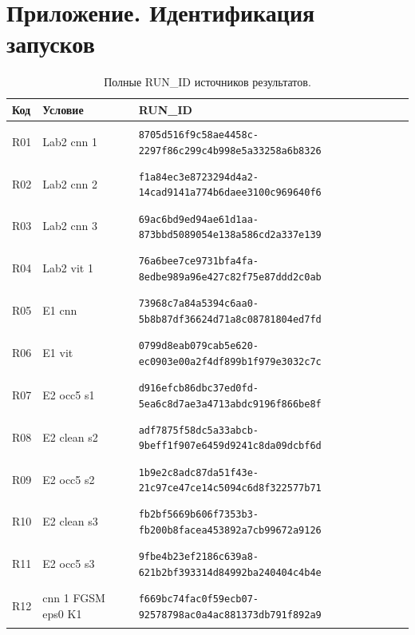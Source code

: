 \section*{Приложение. Идентификация запусков}
\begingroup\small{}
\begin{longtable}{@{}l>{\raggedright\arraybackslash}p{3.5cm}p{10.8cm}@{}}
\caption{Полные RUN\_ID источников результатов.}\\
\toprule Код & Условие & RUN\_ID \\ \midrule \endhead
\hypertarget{R01}{R01} & Lab2 cnn 1 & {\fontsize{8.8}{11}\selectfont\texttt{8705d516f9c58ae4458c-2297f86c299c4b998e5a33258a6b8326}} \\
\hypertarget{R02}{R02} & Lab2 cnn 2 & {\fontsize{8.8}{11}\selectfont\texttt{f1a84ec3e8723294d4a2-14cad9141a774b6daee3100c969640f6}} \\
\hypertarget{R03}{R03} & Lab2 cnn 3 & {\fontsize{8.8}{11}\selectfont\texttt{69ac6bd9ed94ae61d1aa-873bbd5089054e138a586cd2a337e139}} \\
\hypertarget{R04}{R04} & Lab2 vit 1 & {\fontsize{8.8}{11}\selectfont\texttt{76a6bee7ce9731bfa4fa-8edbe989a96e427c82f75e87ddd2c0ab}} \\
\hypertarget{R05}{R05} & E1 cnn & {\fontsize{8.8}{11}\selectfont\texttt{73968c7a84a5394c6aa0-5b8b87df36624d71a8c08781804ed7fd}} \\
\hypertarget{R06}{R06} & E1 vit & {\fontsize{8.8}{11}\selectfont\texttt{0799d8eab079cab5e620-ec0903e00a2f4df899b1f979e3032c7c}} \\
\hypertarget{R07}{R07} & E2 occ5 s1 & {\fontsize{8.8}{11}\selectfont\texttt{d916efcb86dbc37ed0fd-5ea6c8d7ae3a4713abdc9196f866be8f}} \\
\hypertarget{R08}{R08} & E2 clean s2 & {\fontsize{8.8}{11}\selectfont\texttt{adf7875f58dc5a33abcb-9beff1f907e6459d9241c8da09dcbf6d}} \\
\hypertarget{R09}{R09} & E2 occ5 s2 & {\fontsize{8.8}{11}\selectfont\texttt{1b9e2c8adc87da51f43e-21c97ce47ce14c5094c6d8f322577b71}} \\
\hypertarget{R10}{R10} & E2 clean s3 & {\fontsize{8.8}{11}\selectfont\texttt{fb2bf5669b606f7353b3-fb200b8facea453892a7cb99672a9126}} \\
\hypertarget{R11}{R11} & E2 occ5 s3 & {\fontsize{8.8}{11}\selectfont\texttt{9fbe4b23ef2186c639a8-621b2bf393314d84992ba240404c4b4e}} \\
\hypertarget{R12}{R12} & cnn 1 FGSM eps0 K1 & {\fontsize{8.8}{11}\selectfont\texttt{f669bc74fac0f59ecb07-92578798ac0a4ac881373db791f892a9}} \\

\end{longtable}
